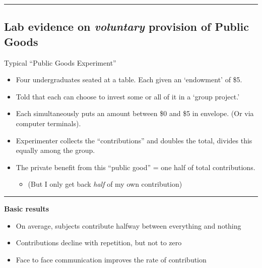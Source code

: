 \documentclass[]{article}
\providecommand{\tightlist}{%
  \setlength{\itemsep}{0pt}\setlength{\parskip}{0pt}}
\begin{document}
\begin{center}\rule{0.5\linewidth}{\linethickness}\end{center}

\hypertarget{lab-evidence-on-voluntary-provision-of-public-goods}{%
\subsection{\texorpdfstring{Lab evidence on \emph{voluntary} provision
of Public
Goods}{Lab evidence on voluntary provision of Public Goods}}\label{lab-evidence-on-voluntary-provision-of-public-goods}}

Typical ``Public Goods Experiment''

\begin{itemize}
\tightlist
\item
  Four undergraduates seated at a table. Each given an `endowment' of
  \$5.
\item
  Told that each can choose to invest some or all of it in a `group
  project.'
\end{itemize}

\bigskip

\begin{itemize}
\item
  Each simultaneously puts an amount between \$0 and \$5 in envelope.
  (Or via computer terminals).
\item
  Experimenter collects the ``contributions'' and doubles the total,
  divides this equally among the group.
\item
  The private benefit from this ``public good'' = one half of total
  contributions.

  \begin{itemize}
  \tightlist
  \item
    (But I only get back \emph{half} of my own contribution)
  \end{itemize}
\end{itemize}

\begin{center}\rule{0.5\linewidth}{\linethickness}\end{center}

\textbf{Basic results}

\begin{itemize}
\tightlist
\item
  On average, subjects contribute halfway between everything and nothing
\item
  Contributions decline with repetition, but not to zero
\item
  Face to face communication improves the rate of contribution
\end{itemize}
\end{document}
